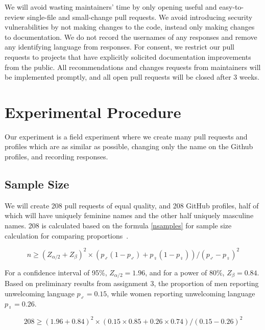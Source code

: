 \documentclass[journal,12pt,onecolumn,]{IEEEtran}
\begin{document}
We will avoid wasting maintainers' time by only opening useful and easy-to-review single-file and small-change pull requests.
We avoid introducing security vulnerabilities by not making changes to the code, instead only making changes to documentation.
We do not record the usernames of any responses and remove any identifying language from responses.
For consent, we restrict our pull requests to projects that have explicitly solicited documentation improvements from the public.
All recommendations and changes requests from maintainers will be implemented promptly, and all open pull requests will be closed after 3 weeks.

\section{Experimental Procedure}

Our experiment is a field experiment where we create many pull requests and profiles which are as similar as possible, changing only the name on the Github profiles, and recording responses.

\subsection{Sample Size}

We will create 208 pull requests of equal quality, and 208 GitHub profiles, half of which will have uniquely feminine names and the other half uniquely masculine names.
208 is calculated based on the formula \ref{nsamples} for sample size calculation for comparing proportions~\cite{wang2007sample}.

\begin{equation} \label{nsamples}
    n \ge ( Z_{\alpha/2} + Z_{\beta} )^2 \times ( p_{\male} ( 1 - p_{\male} ) + p_{\female} ( 1 - p_{\female})) / ( p_{\male} - p_{\female})^2
\end{equation}

For a confidence interval of 95\%, $Z_{\alpha/2} = 1.96$, and for a power of 80\%, $Z_{\beta} = 0.84$.
Based on preliminary results from assignment 3, the proportion of men reporting unwelcoming language $p_{\male} = 0.15$,
while women reporting unwelcoming language $p_{\female} = 0.26$.

\begin{equation} \label{numspluggedin}
    208 \ge (1.96 + 0.84)^2 \times (0.15 \times 0.85 + 0.26 \times 0.74) / (0.15 - 0.26)^2
\end{equation}
\end{document}
